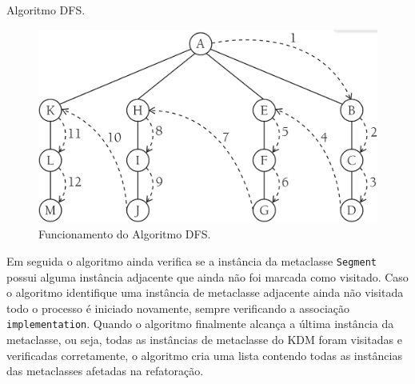 \begin{algoritmo}[h]
     \SetAlgoLined
     \caption{Algoritmo DFS.}
     \label{alg:death1}
   \end{algoritmo}

\begin{figure}[h]
	\centering
	\caption{Funcionamento do Algoritmo DFS.}
	\label{fig:dfsalg}
	\includegraphics[scale=0.3]{images/algWorks2}
	\fautor
\end{figure}

Em seguida o algoritmo ainda verifica se a instância da metaclasse \texttt{Segment} possui alguma instância adjacente que ainda não foi marcada como visitado. Caso o algoritmo identifique uma instância de metaclasse adjacente ainda não visitada todo o processo é iniciado novamente, sempre verificando a associação \texttt{implementation}. Quando o algoritmo finalmente alcança a última instância da metaclasse, ou seja, todas as instâncias de metaclasse do KDM foram visitadas e verificadas corretamente, o algoritmo cria uma lista contendo todas as instâncias das metaclasses afetadas na refatoração. 
   


